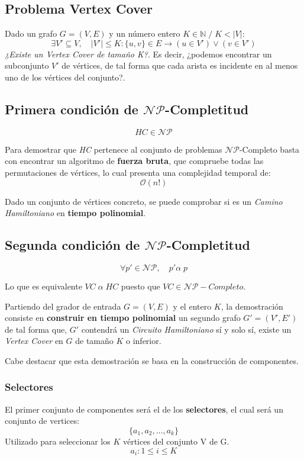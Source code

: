 \documentclass[a4paper]{article}
\begin{document}
\subsection{Problema Vertex Cover}
Dado un grafo $G = (V, E)$ y un número entero $K \in \mathbb{N}\; /\; K < |V|$:
\[\exists V' \subseteq V, \quad |V'| \leq K : \{u, v\} \in E \to (u \in V') \lor (v \in V')\]
\textit{¿Existe un Vertex Cover de tamaño K?}. Es decir, ¿podemos encontrar un subconjunto $V'$ de vértices, de tal forma que cada arista es incidente en al menos uno de los vértices del conjunto?.

\subsection{Primera condición de $\mathcal{NP}$-Completitud}

\[HC \in \mathcal{NP}\]

Para demostrar que \textit{HC} pertenece al conjunto de problemas $\mathcal{NP}$-Completo basta con encontrar un algoritmo de \textbf{fuerza bruta}, que compruebe todas las permutaciones de vértices, lo cual presenta una complejidad temporal de:
\[\mathcal{O}(n!)\]

Dado un conjunto de vértices concreto, se puede comprobar si es un \textit{Camino Hamiltoniano} en \textbf{tiempo polinomial}.

\subsection{Segunda condición de $\mathcal{NP}$-Completitud}

\[\forall p' \in \mathcal{NP}, \quad p'\alpha\; p\]

Lo que es equivalente $VC \; \alpha \; HC$ puesto que $VC \in \mathcal{NP}-Completo$.

Partiendo del grador de entrada $G = (V, E)$ y el entero $K$, la demostración consiste en \textbf{construir en tiempo polinomial} un segundo grafo $G' = (V', E')$ de tal forma que, $G'$ contendrá un \textit{Circuito Hamiltoniano} sí y solo sí, existe un \textit{Vertex Cover} en $G$ de tamaño $K$ o inferior.

Cabe destacar que esta demostración se basa en la construcción de componentes.

\subsubsection{Selectores}

El primer conjunto de componentes será el de los \textbf{selectores}, el cual será un conjunto de vertices:
\[\{a_{1}, a_{2}, \dots, a_{k}\}\]
Utilizado para seleccionar los $K$ vértices del conjunto V de G.
\[a_{i}: 1 \leq i \leq K\]
\end{document}
